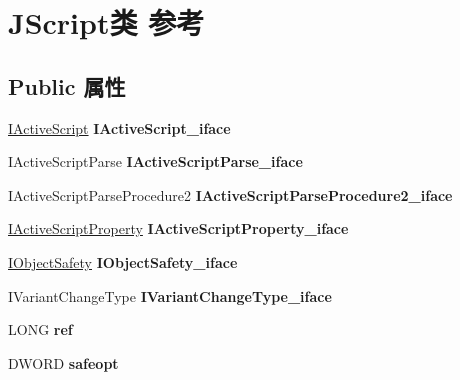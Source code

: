 \hypertarget{struct_j_script}{}\section{J\+Script类 参考}
\label{struct_j_script}
\subsection*{Public 属性}
\begin{DoxyCompactItemize}
\item 
\mbox{\label{struct_j_script_a44e176cc1e451d1380e9fe4d8b9ef41c}} 
\hyperlink{interface_i_active_script}{I\+Active\+Script} {\bfseries I\+Active\+Script\+\_\+iface}
\item 
\mbox{\label{struct_j_script_a15aab3c2b1e52f0fe1ff0a5fc4cd3cd7}} 
I\+Active\+Script\+Parse {\bfseries I\+Active\+Script\+Parse\+\_\+iface}
\item 
\mbox{\label{struct_j_script_a9684ab8e0642d1fa58e99825b811838a}} 
I\+Active\+Script\+Parse\+Procedure2 {\bfseries I\+Active\+Script\+Parse\+Procedure2\+\_\+iface}
\item 
\mbox{\label{struct_j_script_a1f29edd3e428b292f178fa7a46702cee}} 
\hyperlink{interface_i_active_script_property}{I\+Active\+Script\+Property} {\bfseries I\+Active\+Script\+Property\+\_\+iface}
\item 
\mbox{\label{struct_j_script_a492c366ed243af750c49acb1d3ccfdc9}} 
\hyperlink{interface_i_object_safety}{I\+Object\+Safety} {\bfseries I\+Object\+Safety\+\_\+iface}
\item 
\mbox{\label{struct_j_script_affa8d101d8205a118c8b4cfb509e2b67}} 
I\+Variant\+Change\+Type {\bfseries I\+Variant\+Change\+Type\+\_\+iface}
\item 
\mbox{\label{struct_j_script_a614d6ce8d76598beb8c847dd53baacf7}} 
L\+O\+NG {\bfseries ref}
\item 
\mbox{\label{struct_j_script_a72902d9539cf19ef06616253cc97a293}} 
D\+W\+O\+RD {\bfseries safeopt}
\item 

\end{DoxyCompactItemize}
